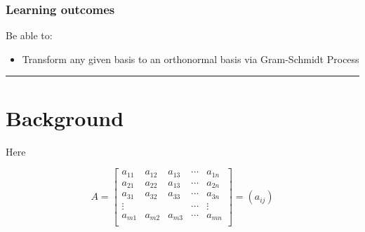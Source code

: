  





\subsubsection*{Learning outcomes}
Be able to:
\begin{itemize}
	 \item Transform any given basis to an orthonormal basis via Gram-Schmidt Process
	
\end{itemize}





\rule[0.01in]{\textwidth}{0.0025in}


%
%
\section{Background}

 \begin{tcolorbox}[colback=yellow!10!,colframe=gray!15!]
 \begin{definition}[Matrix]
Here

\[ 
A =  \begin{bmatrix} 
	a_{11} & a_{12} & a_{13}	& \cdots & a_{1n} \\
 	a_{21} & a_{22} & a_{13}	& \cdots & a_{2n} \\
  	a_{31} & a_{32} & a_{33}	& \cdots & a_{3n} \\
	\vdots 	&	&	& \cdots & \vdots \\
    	a_{m1} & a_{m2} & a_{m3}	& \cdots & a_{mn} \\
    \end{bmatrix}  = (a_{ij})
 \]
 \end{definition}	 
 \end{tcolorbox} 








